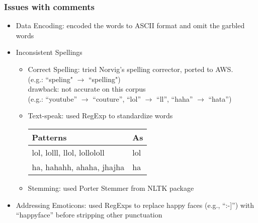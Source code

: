 \documentclass[fleqn]{beamer}
\begin{document}
\begin{frame}
\frametitle{Issues with comments}
    \begin{itemize}
   	\item Data Encoding: encoded the words to ASCII format and omit the garbled words
        \item Inconsistent Spellings 
        	\begin{itemize}
		\item Correct Spelling: tried Norvig's spelling corrector, ported to AWS. \\
		(e.g.: ``speling"  $\rightarrow$ ``spelling")\\
                drawback: not accurate on this corpus\\
                  (e.g.: ``youtube'' $\rightarrow$ ``couture'', ``lol'' $\rightarrow$ ``ll'', ``haha'' $\rightarrow$ ``hata'')
                   \item Text-speak:  used RegExp to standardize words\\
		\begin{center}
        			\begin{tabular}{ | l | l |}
			\hline
			Patterns & As \\ \hline
			lol, lolll, llol, lollololl & lol \\ \hline
			ha, hahahh, ahaha, jhajha & ha \\
			\hline
			\end{tabular}
					
      		\end{center}
		\item Stemming: used Porter Stemmer from NLTK package
	\end{itemize}
       
        \item Addressing Emoticons: used RegExps to replace happy faces (e.g., ``:-]'') with ``happyface'' 
                  before stripping other punctuation

    \end{itemize}
\end{frame}
\end{document}

